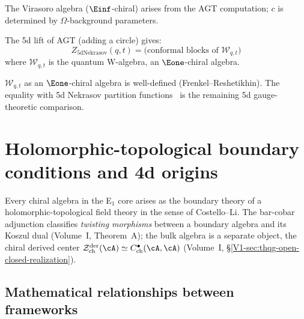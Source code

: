 \begin{corollary}\label{cor:virasoro-gauge}
The Virasoro algebra ($\Einf$-chiral) arises from the AGT computation; $c$ is determined by $\Omega$-background parameters.
\end{corollary}


\begin{remark}\label{rem:q-agt}
The 5d lift of AGT (adding a circle) gives:
\[
Z_{\mathrm{5d Nekrasov}}(q, t) = \text{(conformal blocks of } \mathcal{W}_{q,t})
\]
where $\mathcal{W}_{q,t}$ is the quantum W-algebra, an $\Eone$-chiral algebra.
\end{remark}

\begin{remark}
$\mathcal{W}_{q,t}$ as an $\Eone$-chiral algebra is well-defined
(Frenkel--Reshetikhin). The equality with 5d Nekrasov partition
functions~\cite{AY10} is the remaining 5d gauge-theoretic comparison.
\end{remark}


\section{Holomorphic-topological boundary conditions and 4d origins}
\label{sec:ht-boundary-physical-origins}


Every chiral algebra in the E$_1$ core arises as the boundary theory of a
holomorphic-topological field theory in the sense of Costello--Li.
The bar-cobar adjunction classifies \emph{twisting morphisms}
between a boundary algebra and its Koszul dual (Volume~I, Theorem~A);
the bulk algebra is a separate object, the chiral derived center
$\mathcal{Z}^{\mathrm{der}}_{\mathrm{ch}}(\cA)
\simeq C^\bullet_{\mathrm{ch}}(\cA,\cA)$
(Volume~I, \S\ref*{V1-sec:thqg-open-closed-realization}).

\subsection{Mathematical relationships between frameworks}
\label{sec:precise-relationships-frameworks}

